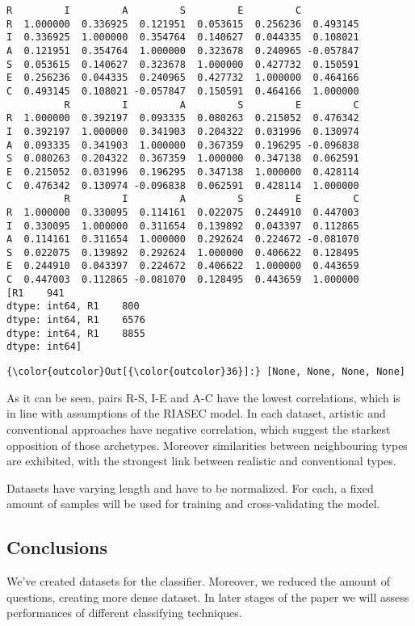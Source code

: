 \documentclass[11pt]{article}
\begin{document}
    \begin{Verbatim}[commandchars=\\\{\}]
          R         I         A         S         E         C
R  1.000000  0.336925  0.121951  0.053615  0.256236  0.493145
I  0.336925  1.000000  0.354764  0.140627  0.044335  0.108021
A  0.121951  0.354764  1.000000  0.323678  0.240965 -0.057847
S  0.053615  0.140627  0.323678  1.000000  0.427732  0.150591
E  0.256236  0.044335  0.240965  0.427732  1.000000  0.464166
C  0.493145  0.108021 -0.057847  0.150591  0.464166  1.000000
          R         I         A         S         E         C
R  1.000000  0.392197  0.093335  0.080263  0.215052  0.476342
I  0.392197  1.000000  0.341903  0.204322  0.031996  0.130974
A  0.093335  0.341903  1.000000  0.367359  0.196295 -0.096838
S  0.080263  0.204322  0.367359  1.000000  0.347138  0.062591
E  0.215052  0.031996  0.196295  0.347138  1.000000  0.428114
C  0.476342  0.130974 -0.096838  0.062591  0.428114  1.000000
          R         I         A         S         E         C
R  1.000000  0.330095  0.114161  0.022075  0.244910  0.447003
I  0.330095  1.000000  0.311654  0.139892  0.043397  0.112865
A  0.114161  0.311654  1.000000  0.292624  0.224672 -0.081070
S  0.022075  0.139892  0.292624  1.000000  0.406622  0.128495
E  0.244910  0.043397  0.224672  0.406622  1.000000  0.443659
C  0.447003  0.112865 -0.081070  0.128495  0.443659  1.000000
[R1    941
dtype: int64, R1    800
dtype: int64, R1    6576
dtype: int64, R1    8855
dtype: int64]

    \end{Verbatim}

            \begin{Verbatim}[commandchars=\\\{\}]
{\color{outcolor}Out[{\color{outcolor}36}]:} [None, None, None, None]
\end{Verbatim}
        
    As it can be seen, pairs R-S, I-E and A-C have the lowest correlations,
which is in line with assumptions of the RIASEC model. In each dataset,
artistic and conventional approaches have negative correlation, which
suggest the starkest opposition of those archetypes. Moreover
similarities between neighbouring types are exhibited, with the
strongest link between realistic and conventional types.

Datasets have varying length and have to be normalized. For each, a
fixed amount of samples will be used for training and cross-validating
the model.

\subsection{Conclusions}\label{conclusions}

We've created datasets for the classifier. Moreover, we reduced the
amount of questions, creating more dense dataset. In later stages of the
paper we will assess performances of different classifying techniques.


    
    
    
    
\end{document}
